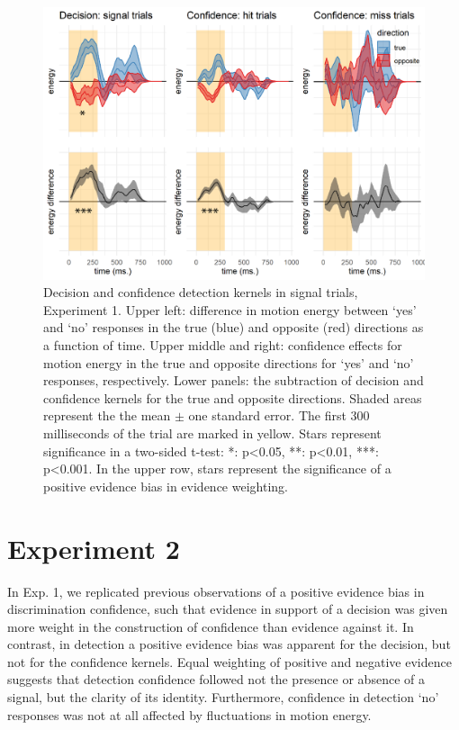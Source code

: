 \documentclass[12pt,twoside]{reedthesis}
\begin{document}
\begin{figure}
\includegraphics[width=\textwidth]{figure/RC/RC-exp1-signal-RC-enhanced} \caption[Reverse correlation of detection signal trials, Exp. 1]{Decision and confidence detection kernels in signal trials, Experiment 1. Upper left: difference in motion energy between `yes' and `no' responses in the true (blue) and opposite (red) directions as a function of time. Upper middle and right: confidence effects for motion energy in the true and opposite directions for `yes' and `no' responses, respectively. Lower panels: the subtraction of decision and confidence kernels for the true and opposite directions. Shaded areas represent the the mean \(\pm\) one standard error. The first 300 milliseconds of the trial are marked in yellow. Stars represent significance in a two-sided t-test: *: p\textless0.05, **: p\textless0.01, ***: p\textless0.001. In the upper row, stars represent the significance of a positive evidence bias in evidence weighting.}\label{fig:RC-exp1-signal-figure}
\end{figure}
\hypertarget{experiment-2-1}{%
\section{Experiment 2}\label{experiment-2-1}}

In Exp. 1, we replicated previous observations of a positive evidence bias in discrimination confidence, such that evidence in support of a decision was given more weight in the construction of confidence than evidence against it. In contrast, in detection a positive evidence bias was apparent for the decision, but not for the confidence kernels. Equal weighting of positive and negative evidence suggests that detection confidence followed not the presence or absence of a signal, but the clarity of its identity. Furthermore, confidence in detection `no' responses was not at all affected by fluctuations in motion energy.
\end{document}
